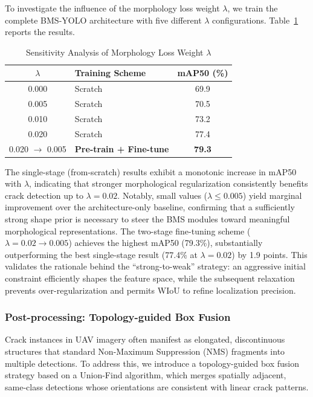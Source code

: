 To investigate the influence of the morphology loss weight $\lambda$, we train the complete BMS-YOLO architecture with five different $\lambda$ configurations. Table~\ref{tab:lambda} reports the results.

\begin{table}[!t]
\caption{Sensitivity Analysis of Morphology Loss Weight $\lambda$}
\label{tab:lambda}
\centering
\setlength{\tabcolsep}{5pt}
\begin{tabular}{c|l|c}
\hline
\hline
$\lambda$ & Training Scheme & mAP50 (\%) \\
\hline
0.000 & Scratch & 69.9 \\
0.005 & Scratch & 70.5 \\
0.010 & Scratch & 73.2 \\
0.020 & Scratch & 77.4 \\
0.020 $\rightarrow$ 0.005 & \textbf{Pre-train + Fine-tune} & \textbf{79.3} \\
\hline
\end{tabular}
\end{table}

The single-stage (from-scratch) results exhibit a monotonic increase in mAP50 with $\lambda$, indicating that stronger morphological regularization consistently benefits crack detection up to $\lambda = 0.02$. Notably, small values ($\lambda \leq 0.005$) yield marginal improvement over the architecture-only baseline, confirming that a sufficiently strong shape prior is necessary to steer the BMS modules toward meaningful morphological representations. The two-stage fine-tuning scheme ($\lambda = 0.02 \rightarrow 0.005$) achieves the highest mAP50 (79.3\%), substantially outperforming the best single-stage result (77.4\% at $\lambda = 0.02$) by 1.9 points. This validates the rationale behind the ``strong-to-weak'' strategy: an aggressive initial constraint efficiently shapes the feature space, while the subsequent relaxation prevents over-regularization and permits WIoU to refine localization precision.

\subsubsection{Post-processing: Topology-guided Box Fusion}

Crack instances in UAV imagery often manifest as elongated, discontinuous structures that standard Non-Maximum Suppression (NMS) fragments into multiple detections. To address this, we introduce a topology-guided box fusion strategy based on a Union-Find algorithm, which merges spatially adjacent, same-class detections whose orientations are consistent with linear crack patterns.

